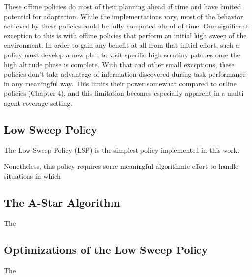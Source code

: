 These offline policies do most of their planning ahead of time and have limited potential for adaptation. While the implementations vary, most of the behavior achieved by these policies could be fully computed ahead of time. One significant exception to this is with offline policies that perform an initial high sweep of the environment. In order to gain any benefit at all from that initial effort, such a policy must develop a new plan to visit specific high scrutiny patches once the high altitude phase is complete. With that and other small exceptions, these policies don't take advantage of information discovered during task performance in any meaningful way. This limits their power somewhat compared to online policies (Chapter 4), and this limitation becomes especially apparent in a multi agent coverage setting.

\subsection{Low Sweep Policy}

The Low Sweep Policy (LSP) is the simplest policy implemented in this work. 

Nonetheless, this policy requires some meaningful algorithmic effort to handle situations in which




\subsection{The A-Star Algorithm}

The

\subsection{Optimizations of the Low Sweep Policy}


The